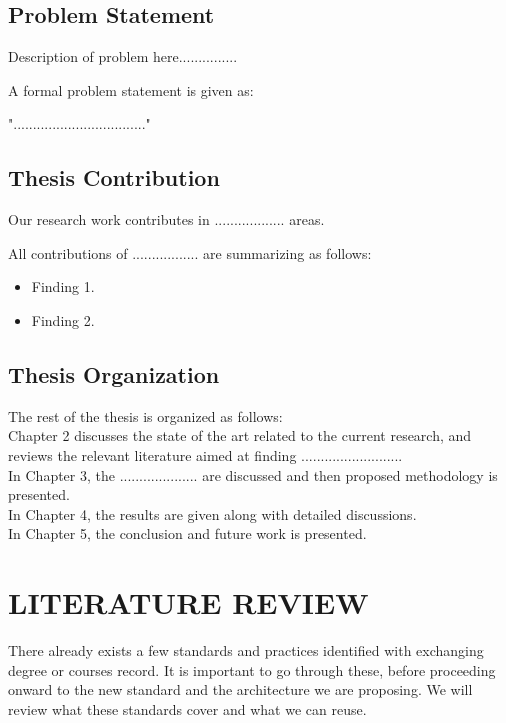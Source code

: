 \documentclass[12pt,a4paper,oneside]{book} %
\begin{document}
\section{Problem Statement}

Description of problem here...............

A formal problem statement is given as:

".................................."

\section{Thesis Contribution}

Our research work contributes in .................. areas.

All contributions of ................. are summarizing as follows:

\begin{itemize}
\item
Finding 1.
\item
Finding 2.
\end{itemize}

\section{Thesis Organization}

The rest of the thesis is organized as follows: \\

Chapter 2 discusses the state of the art related to the current research, and reviews the relevant literature aimed at finding .......................... \\

In Chapter 3, the .................... are discussed and then proposed methodology is presented. \\

In Chapter 4, the results are given along with detailed discussions. \\

In Chapter 5, the conclusion and future work is presented.

\chapter{LITERATURE REVIEW}\label{c-work}

There already exists a few standards and practices identified with exchanging degree or courses record. It is important to go through these, before proceeding onward to the new standard and the architecture we are proposing. We will review what these standards cover and what we can reuse.
\end{document}
